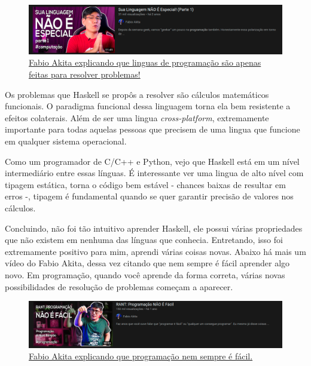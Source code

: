 \documentclass[
  12pt,				         %
  oneside,			       %
  a4paper,			       %
  english,		       	 %
  brazil,			      	 %
]{abntex2}
\begin{document}
\begin{apendicesenv}
        \begin{figure}[ht]
          \includegraphics[width =\textwidth]{fabio_akita_lingua.png}
          \caption{\href{https://www.youtube.com/watch?v=p9-WuJbVHHc}{Fabio Akita explicando que linguas de programação são apenas feitas para resolver problemas!}}
        \end{figure}

        Os problemas que Haskell se propôs a resolver são cálculos matemáticos
        funcionais. O paradigma funcional dessa linguagem torna ela bem resistente a efeitos colaterais. Além de ser uma lingua
        \emph{cross-platform}, extremamente importante para todas aquelas pessoas que precisem de uma lingua que funcione
        em qualquer sistema operacional. 

        Como um programador de C/C++ e Python, vejo que Haskell está em um nível intermediário entre essas línguas.
        É interessante ver uma lingua de alto nível com tipagem estática, torna o código bem estável - chances baixas de 
        resultar em erros -, tipagem é fundamental quando se quer garantir precisão de valores nos cálculos.

        Concluindo, não foi tão intuitivo aprender Haskell, ele possui várias propriedades que não existem em nenhuma das línguas
        que conhecia. Entretando, isso foi extremamente positivo para mim, aprendi várias coisas novas. Abaixo há
        mais um vídeo do Fabio Akita, dessa vez citando que nem sempre é fácil aprender algo novo. Em programação,
        quando você aprende da forma correta, várias novas possibilidades de resolução de problemas começam a aparecer.

        \begin{figure}[ht]
          \includegraphics[width =\textwidth]{fabio_akita_programar_eh_dificil.png}
          \caption{\href{https://www.youtube.com/watch?v=V7oUDL7E1g4}{Fabio Akita explicando que programação nem sempre é fácil.}}
        \end{figure}


\end{apendicesenv}
\end{document}
